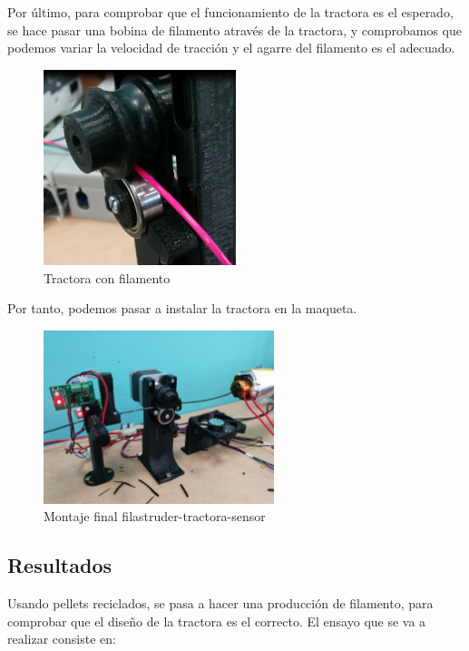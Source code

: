 Por último, para comprobar que el funcionamiento de la tractora es el esperado, se hace pasar una bobina de filamento através de la tractora, y comprobamos que podemos variar la velocidad de tracción y el agarre del filamento es el adecuado.

	\begin{figure}[H]
            \centering
            \includegraphics[width=0.5\textwidth]{images/producciones/tractora/final.png}
            \caption{Tractora con filamento}
            \label{fig:tractora_fila}
    \end{figure}


Por tanto, podemos pasar a instalar la tractora en la maqueta.

\begin{figure}[H]
    \centering
    \includegraphics[width=0.6\textwidth]{images/producciones/tractora/IMG_20150709_130326.jpg}
    \caption{Montaje final filastruder-tractora-sensor}
    \label{fig:montaje_final}
\end{figure}

\subsection{Resultados}

Usando pellets reciclados, se pasa a hacer una producción de filamento, para comprobar que el diseño de la tractora es el correcto. El ensayo que se va a realizar consiste en:


